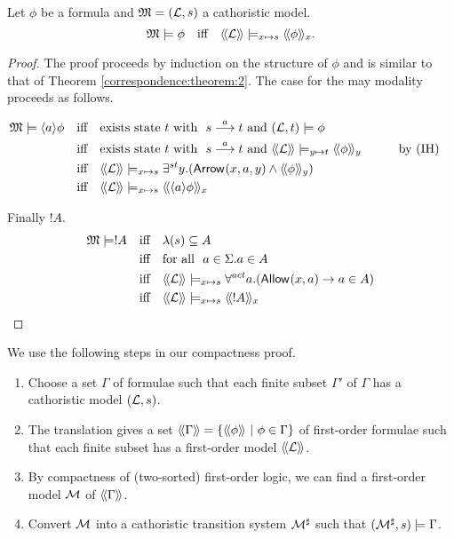 \begin{theorem}\label{correspondence:theorem:2}
Let $\phi$ be a \cathoristic{} formula and $\frak{M} = (\mathcal{L}, s)$ a cathoristic
model.
\[
   \frak{M} \models \phi \quad  \text{iff} \quad \langle\!\langle \mathcal{L} \rangle\!\rangle \models_{x \mapsto s} \langle\!\langle \phi \rangle\!\rangle_x.
\]
\end{theorem}
\begin{proof}
The proof proceeds by induction on the structure of $\phi$ and is
similar to that of Theorem \ref{correspondence:theorem:2}.
The case for the may modality proceeds as follows.  

\begin{alignat*}{2}
  \MMM \models \MAY{a}\phi
     &\quad\text{iff}\quad 
  \text{exists state $t$ with }\ s \TRANS{a} t\ \text{and}\ (\LLL, t) \models \phi \\
     &\quad\text{iff}\quad
  \text{exists state $t$ with }\ s \TRANS{a} t\ \text{and}\ \SEMBTWO{\LLL} \models_{y \mapsto t} \SEMBTWO{\phi}_y &\qquad& \text{by (IH)}\\
     &\quad\text{iff}\quad
  \SEMBTWO{\LLL} \models_{x \mapsto s} \exists^{st} y.(\ARROWTWO{}{x}{a}{y} \AND \SEMBTWO{\phi}_y) \\
     &\quad\text{iff}\quad
   \SEMBTWO{\LLL} \models_{x \mapsto s} \SEMBTWO{\MAY{a}{\phi}}_x
\end{alignat*}

Finally $!A$.
\begin{alignat*}{2}
  \frak{M} \models !A
     &\quad\text{iff}\quad
  \lambda (s) \subseteq A \\
      &\quad\text{iff}\quad
  \text{for all }\ a \in \Sigma. a \in A \\
     &\quad\text{iff}\quad
  \langle\!\langle \mathcal{L} \rangle\!\rangle \models_{x \mapsto s} \forall^{act} a. (\mathsf{Allow}^{}(x, a) \rightarrow a \in A) \\
     &\quad\text{iff}\quad
  \langle\!\langle \mathcal{L} \rangle\!\rangle \models_{x \mapsto s} \langle\!\langle !A \rangle\!\rangle_x
\end{alignat*}
\end{proof}

\NI We use the following steps in our compactness proof.

\begin{enumerate}

\item Choose a set $\Gamma$ of \cathoristic{} formulae such that each finite
  subset $\Gamma'$ of $\Gamma$ has a cathoristic model $(\mathcal{L}, s)$.

\item The translation gives a set $\langle\!\langle \Gamma \rangle\!\rangle =
  \{\langle\!\langle \phi \rangle\!\rangle\ |\ \phi \in \Gamma\}$ of first-order formulae such that
  each finite subset has a first-order model $\langle\!\langle \mathcal{L} \rangle\!\rangle$.

\item By compactness of (two-sorted) first-order logic, we can find a
  first-order model $\mathcal{M}$ of $\langle\!\langle \Gamma \rangle\!\rangle$.

\item\label{compactness:step:4} Convert $\mathcal{M}$ into a cathoristic transition system
  $\mathcal{M}^{\sharp}$ such that $(\mathcal{M}^{\sharp}, s) \models \Gamma$.

\end{enumerate}

